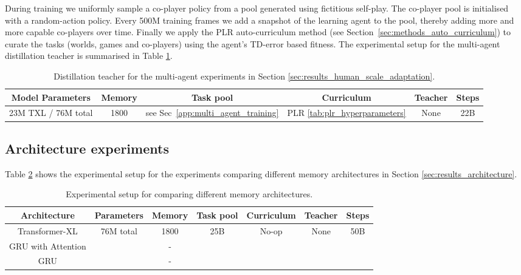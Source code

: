 During training we uniformly sample a co-player policy from a pool generated using fictitious self-play. The co-player pool is initialised with a random-action policy. Every 500M training frames we add a snapshot of the learning agent to the pool, thereby adding more and more capable co-players over time. Finally we apply the PLR auto-curriculum method (see Section~\ref{sec:methods_auto_curriculum}) to curate the tasks (worlds, games and co-players) using the agent's TD-error based fitness. The experimental setup for the multi-agent distillation teacher is summarised in Table \ref{tab:multi-agent-teacher}.

\begin{table}[h!]
  \begin{center}
    \caption{Distillation teacher for the multi-agent experiments in Section \ref{sec:results_human_scale_adaptation}.}
    \begin{tabular}{c|c|c|c|c|c}
    \label{tab:multi-agent-teacher}
      Model Parameters & Memory & Task pool & Curriculum & Teacher & Steps\\
      \hline
      23M TXL / 76M total & 1800 & see Sec~\ref{app:multi_agent_training} & PLR \ref{tab:plr_hyperparameters} & None & 22B \\
    \end{tabular}
  \end{center}
\end{table}

\subsection{Architecture experiments}
\label{app:architecture-experiments}
Table \ref{tab:arch_exp} shows the experimental setup for the experiments comparing different memory architectures in Section \ref{sec:results_architecture}.
\begin{table}[h!]
  \begin{center}
    \caption{Experimental setup for comparing different memory architectures.}
    \begin{tabular}{c|c|c|c|c|c|c}
    \label{tab:arch_exp}
      Architecture & Parameters & Memory & Task pool & Curriculum & Teacher & Steps\\
      \hline
      Transformer-XL & \multirow{3}{*}{76M total} & 1800 & \multirow{3}{*}{25B} &\multirow{3}{*}{No-op}  & \multirow{3}{*}{None} & \multirow{3}{*}{50B} \\
      GRU with Attention & & - & & & & \\ 
      GRU & & - & & & & \\ 
    \end{tabular}
  \end{center}
\end{table}

